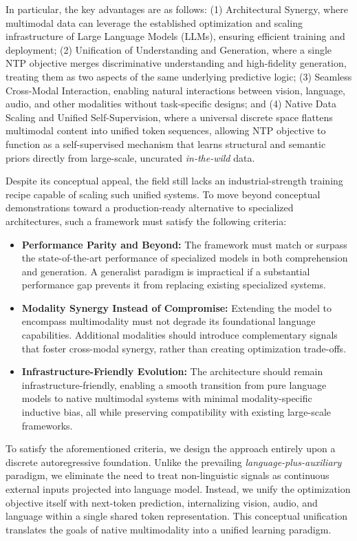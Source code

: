 \documentclass{article}
\begin{document}
In particular, the key advantages are as follows: (1) Architectural Synergy, where multimodal data can leverage the established optimization and scaling infrastructure of Large Language Models (LLMs), ensuring efficient training and deployment; (2) Unification of Understanding and Generation, where a single NTP objective merges discriminative understanding and high-fidelity generation, treating them as two aspects of the same underlying predictive logic; (3) Seamless Cross-Modal Interaction, enabling natural interactions between vision, language, audio, and other modalities without task-specific designs; and (4) Native Data Scaling and Unified Self-Supervision, where a universal discrete space flattens multimodal content into unified token sequences, allowing NTP objective to function as a self-supervised mechanism that learns structural and semantic priors directly from large-scale, uncurated \textit{in-the-wild} data.


Despite its conceptual appeal, the field still lacks an industrial-strength training recipe capable of scaling such unified systems. To move beyond conceptual demonstrations toward a production-ready alternative to specialized architectures, such a framework must satisfy the following criteria:

\begin{itemize}
\item \textbf{Performance Parity and Beyond:} The framework must match or surpass the state-of-the-art performance of specialized models in both comprehension and generation. A generalist paradigm is impractical if a substantial performance gap prevents it from replacing existing specialized systems.
\item \textbf{Modality Synergy Instead of Compromise:} Extending the model to encompass multimodality must not degrade its foundational language capabilities. Additional modalities should introduce complementary signals that foster cross-modal synergy, rather than creating optimization trade-offs.
\item \textbf{Infrastructure-Friendly Evolution:} The architecture should remain infrastructure-friendly, enabling a smooth transition from pure language models to native multimodal systems with minimal modality-specific inductive bias, all while preserving compatibility with existing large-scale frameworks.
\end{itemize}

To satisfy the aforementioned criteria, we design the approach entirely upon a discrete autoregressive foundation. Unlike the prevailing \textit{language-plus-auxiliary} paradigm, we eliminate the need to treat non-linguistic signals as continuous external inputs projected into language model. Instead, we unify the optimization objective itself with next-token prediction, internalizing vision, audio, and language within a single shared token representation. This conceptual unification translates the goals of native multimodality into a unified learning paradigm.
\end{document}
